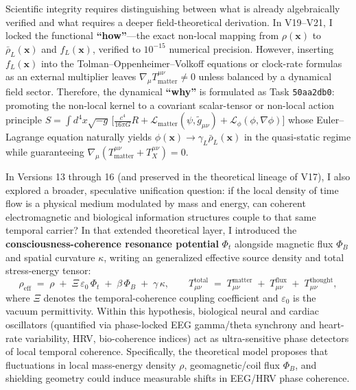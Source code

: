 \documentclass[10pt,a4paper]{article}
\begin{document}
\par
Scientific integrity requires distinguishing between what is already algebraically verified and what requires a deeper field-theoretical derivation. In V19--V21, I locked the functional \textbf{``how''}---the exact non-local mapping from $\rho(\mathbf{x})$ to $\bar{\rho}_L(\mathbf{x})$ and $f_L(\mathbf{x})$, verified to $10^{-15}$ numerical precision. However, inserting $f_L(\mathbf{x})$ into the Tolman--Oppenheimer--Volkoff equations or clock-rate formulas as an external multiplier leaves $\nabla_\mu T^{\mu\nu}_{\text{matter}} \neq 0$ unless balanced by a dynamical field sector. Therefore, the dynamical \textbf{``why''} is formulated as Task \texttt{50aa2db0}: promoting the non-local kernel to a covariant scalar-tensor or non-local action principle $S = \int d^4x\sqrt{-g}\,\bigl[\frac{c^4}{16\pi G}R + \mathcal{L}_{\text{matter}}(\psi, \tilde{g}_{\mu\nu}) + \mathcal{L}_\phi(\phi,\nabla\phi)\bigr]$ whose Euler--Lagrange equation naturally yields $\phi(\mathbf{x}) \to \gamma_L\bar{\rho}_L(\mathbf{x})$ in the quasi-static regime while guaranteeing $\nabla_\mu(T^{\mu\nu}_{\text{matter}} + T^{\mu\nu}_X) = 0$.

\par
In Versions 13 through 16 (and preserved in the theoretical lineage of V17), I also explored a broader, speculative unification question: if the local density of time flow is a physical medium modulated by mass and energy, can coherent electromagnetic and biological information structures couple to that same temporal carrier? In that extended theoretical layer, I introduced the \textbf{consciousness-coherence resonance potential} $\Phi_t$ alongside magnetic flux $\Phi_B$ and spatial curvature $\kappa$, writing an generalized effective source density and total stress-energy tensor:
\begin{equation}
  \rho_{\text{eff}} \;=\; \rho \;+\; \Xi\,\varepsilon_0\,\Phi_t \;+\; \beta\,\Phi_B \;+\; \gamma\,\kappa, \qquad
  T_{\mu\nu}^{\text{total}} \;=\; T_{\mu\nu}^{\text{matter}} \;+\; T_{\mu\nu}^{\text{flux}} \;+\; T_{\mu\nu}^{\text{thought}},
\end{equation}
where $\Xi$ denotes the temporal-coherence coupling coefficient and $\varepsilon_0$ is the vacuum permittivity. Within this hypothesis, biological neural and cardiac oscillators (quantified via phase-locked EEG gamma/theta synchrony and heart-rate variability, HRV, bio-coherence indices) act as ultra-sensitive phase detectors of local temporal coherence. Specifically, the theoretical model proposes that fluctuations in local mass-energy density $\rho$, geomagnetic/coil flux $\Phi_B$, and shielding geometry could induce measurable shifts in EEG/HRV phase coherence.
\end{document}
